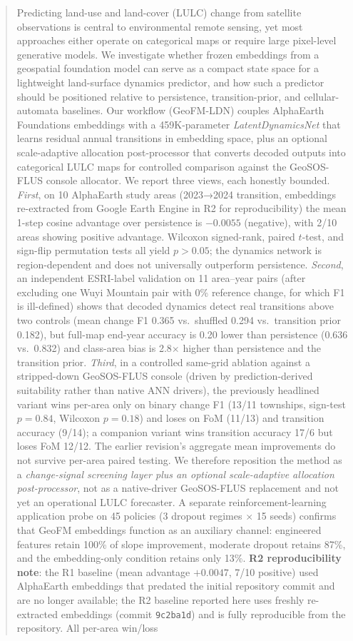 \documentclass{article}
\begin{document}
\begin{abstract}
Predicting land-use and land-cover (LULC) change from satellite observations is central to environmental remote sensing, yet most approaches either operate on categorical maps or require large pixel-level generative models. We investigate whether frozen embeddings from a geospatial foundation model can serve as a compact state space for a lightweight land-surface dynamics predictor, and how such a predictor should be positioned relative to persistence, transition-prior, and cellular-automata baselines. Our workflow (GeoFM-LDN) couples AlphaEarth Foundations embeddings with a 459K-parameter \textit{LatentDynamicsNet} that learns residual annual transitions in embedding space, plus an optional scale-adaptive allocation post-processor that converts decoded outputs into categorical LULC maps for controlled comparison against the GeoSOS-FLUS console allocator. We report three views, each honestly bounded. \textit{First}, on 10 AlphaEarth study areas (2023→2024 transition, embeddings re-extracted from Google Earth Engine in R2 for reproducibility) the mean 1-step cosine advantage over persistence is $-0.0055$ (negative), with 2/10 areas showing positive advantage. Wilcoxon signed-rank, paired $t$-test, and sign-flip permutation tests all yield $p>0.05$; the dynamics network is region-dependent and does not universally outperform persistence. \textit{Second}, an independent ESRI-label validation on 11 area--year pairs (after excluding one Wuyi Mountain pair with 0\% reference change, for which F1 is ill-defined) shows that decoded dynamics detect real transitions above two controls (mean change F1 0.365 vs.\ shuffled 0.294 vs.\ transition prior 0.182), but full-map end-year accuracy is 0.20 lower than persistence (0.636 vs.\ 0.832) and class-area bias is 2.8$\times$ higher than persistence and the transition prior. \textit{Third}, in a controlled same-grid ablation against a stripped-down GeoSOS-FLUS console (driven by prediction-derived suitability rather than native ANN drivers), the previously headlined variant wins per-area only on binary change F1 (13/11 townships, sign-test $p=0.84$, Wilcoxon $p=0.18$) and loses on FoM (11/13) and transition accuracy (9/14); a companion variant wins transition accuracy 17/6 but loses FoM 12/12. The earlier revision's aggregate mean improvements do not survive per-area paired testing. We therefore reposition the method as a \textit{change-signal screening layer plus an optional scale-adaptive allocation post-processor}, not as a native-driver GeoSOS-FLUS replacement and not yet an operational LULC forecaster. A separate reinforcement-learning application probe on 45 policies (3 dropout regimes $\times$ 15 seeds) confirms that GeoFM embeddings function as an auxiliary channel: engineered features retain 100\% of slope improvement, moderate dropout retains 87\%, and the embedding-only condition retains only 13\%. \textbf{R2 reproducibility note}: the R1 baseline (mean advantage $+0.0047$, 7/10 positive) used AlphaEarth embeddings that predated the initial repository commit and are no longer available; the R2 baseline reported here uses freshly re-extracted embeddings (commit \texttt{9c2ba1d}) and is fully reproducible from the repository. All per-area win/loss 
\end{abstract}
\end{document}
